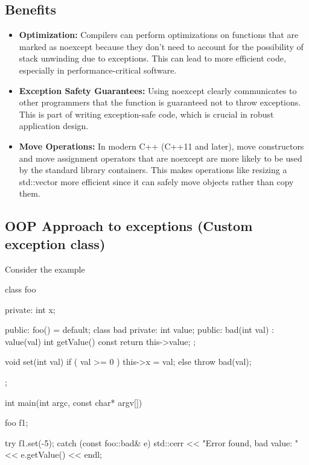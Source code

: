 \documentclass{report}
\begin{document}
\begin{concept}
    \subsection{Benefits}
    \begin{itemize}
        \item \textbf{Optimization:} Compilers can perform optimizations on functions that are marked as noexcept because they don't need to account for the possibility of stack unwinding due to exceptions. This can lead to more efficient code, especially in performance-critical software.
        \item \textbf{Exception Safety Guarantees:} Using noexcept clearly communicates to other programmers that the function is guaranteed not to throw exceptions. This is part of writing exception-safe code, which is crucial in robust application design.
        \item \textbf{Move Operations:} In modern C++ (C++11 and later), move constructors and move assignment operators that are noexcept are more likely to be used by the standard library containers. This makes operations like resizing a std::vector more efficient since it can safely move objects rather than copy them.
    \end{itemize}

    \pagebreak 
    \subsection{OOP Approach to exceptions (Custom exception class)}
    \bigbreak \noindent 
    Consider the example\bigbreak \noindent 
    \begin{cppcode}
        class foo {
            private:
            int x;

            public:
            foo() = default;
            class bad { 
                private:
                    int value;
                public:
                    bad(int val) : value(val) {}
                    int getValue() const { return this->value; }
            };

            void set(int val) {
                if ( val >= 0 ) { this->x = val;} 
                else { throw bad(val); }
            }
        };

        int main(int argc, const char* argv[]) { 
            foo f1;

            try {
                f1.set(-5);
            } catch (const foo::bad& e) {
                std::cerr << "Error found, bad value: " << e.getValue() << endl;
            }

}
\end{cppcode}
\end{concept}
\end{document}
